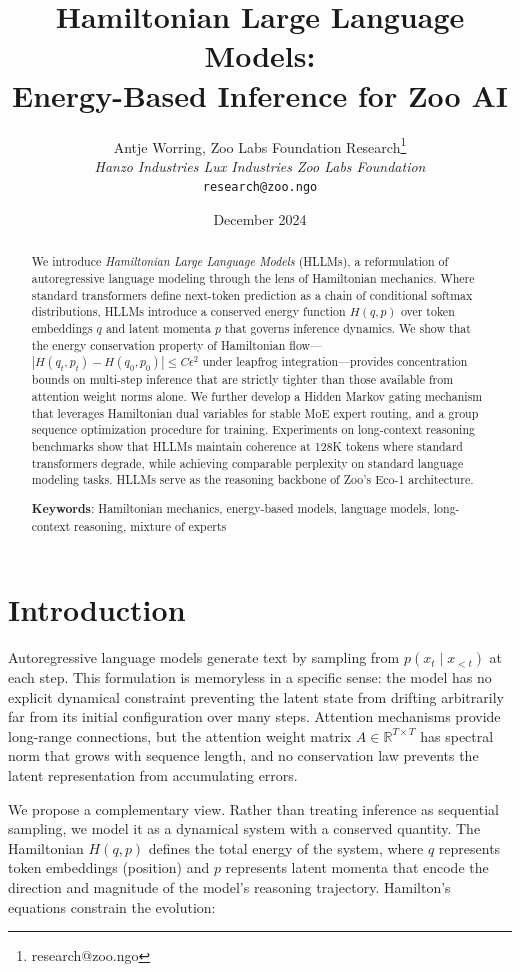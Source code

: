 \documentclass[11pt,letterpaper]{article}
\title{\textbf{Hamiltonian Large Language Models:\\Energy-Based Inference for Zoo AI}}
\author{
Antje Worring, Zoo Labs Foundation Research\thanks{research@zoo.ngo}\\
\textit{Hanzo Industries \quad Lux Industries \quad Zoo Labs Foundation}\\
\texttt{research@zoo.ngo}
}
\date{December 2024}
\newcommand{\R}{\mathbb{R}}
\begin{document}
\zoocoverpage

\begin{abstract}
We introduce \emph{Hamiltonian Large Language Models} (HLLMs), a reformulation of autoregressive language modeling through the lens of Hamiltonian mechanics. Where standard transformers define next-token prediction as a chain of conditional softmax distributions, HLLMs introduce a conserved energy function $H(q, p)$ over token embeddings $q$ and latent momenta $p$ that governs inference dynamics. We show that the energy conservation property of Hamiltonian flow---$|H(q_t, p_t) - H(q_0, p_0)| \leq C\epsilon^2$ under leapfrog integration---provides concentration bounds on multi-step inference that are strictly tighter than those available from attention weight norms alone. We further develop a Hidden Markov gating mechanism that leverages Hamiltonian dual variables for stable MoE expert routing, and a group sequence optimization procedure for training. Experiments on long-context reasoning benchmarks show that HLLMs maintain coherence at 128K tokens where standard transformers degrade, while achieving comparable perplexity on standard language modeling tasks. HLLMs serve as the reasoning backbone of Zoo's Eco-1 architecture.

\textbf{Keywords}: Hamiltonian mechanics, energy-based models, language models, long-context reasoning, mixture of experts
\end{abstract}

\section{Introduction}

Autoregressive language models generate text by sampling from $p(x_t \mid x_{<t})$ at each step. This formulation is memoryless in a specific sense: the model has no explicit dynamical constraint preventing the latent state from drifting arbitrarily far from its initial configuration over many steps. Attention mechanisms provide long-range connections, but the attention weight matrix $A \in \R^{T \times T}$ has spectral norm that grows with sequence length, and no conservation law prevents the latent representation from accumulating errors.

We propose a complementary view. Rather than treating inference as sequential sampling, we model it as a dynamical system with a conserved quantity. The Hamiltonian $H(q, p)$ defines the total energy of the system, where $q$ represents token embeddings (position) and $p$ represents latent momenta that encode the direction and magnitude of the model's reasoning trajectory. Hamilton's equations constrain the evolution:
\end{document}
